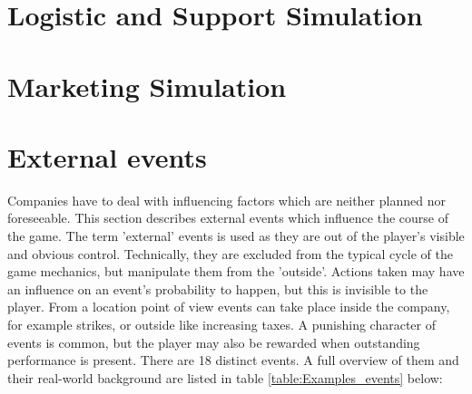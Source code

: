 \documentclass[11pt,titlepage,oneside,openany]{book}
\begin{document}









\section{Logistic and Support Simulation}



\section{Marketing Simulation}
\label{markting_simulation}











\section{External events}
\label{sec:ectEvent}
Companies have to deal with influencing factors which are neither planned nor foreseeable. \cite{Campbell} This section describes external events which influence the course of the game. The term 'external' events is used as they are out of the player's visible and obvious control. Technically, they are excluded from the typical cycle of the game mechanics, but manipulate them from the 'outside'. Actions taken may have an influence on an event's probability to happen, but this is invisible to the player. From a location point of view events can take place inside the company, for example strikes, or outside like increasing taxes. A punishing character of events is common, but the player may also be rewarded when outstanding performance is present. There are 18 distinct events. A full overview of them and their real-world background are listed in table \ref{table:Examples_events} below: \\ 
\end{document}
